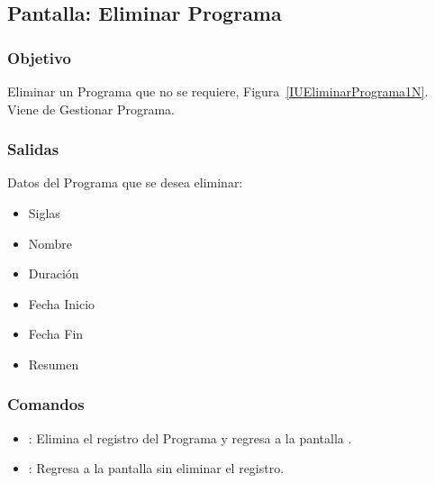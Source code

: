 \subsection{Pantalla: Eliminar Programa}

\subsubsection{Objetivo}
Eliminar un Programa que no se requiere, Figura~\ref{IUEliminarPrograma1N}. Viene de Gestionar Programa.


\subsubsection{Salidas}
Datos del Programa que se desea eliminar:
\begin{itemize}
	\item Siglas
	\item Nombre
	\item Duración
	\item Fecha Inicio
	\item Fecha Fin
	\item Resumen
\end{itemize}

\subsubsection{Comandos}
\begin{itemize}
 \item {}: Elimina el registro del Programa y regresa a la pantalla . 
 \item {}: Regresa a la pantalla  sin eliminar el registro.
\end{itemize}




